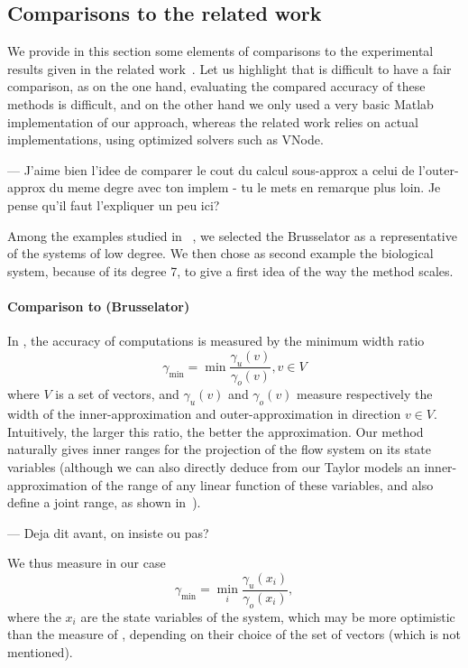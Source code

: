 \documentclass{sig-alternate-05-2015} %
\newcommand\ForAuthors[1]%
 {\par\smallskip                     %
  \begin{center}%
   \fbox%
   {\parbox{0.9\linewidth}%
    {\raggedright\sc--- #1}%
   }%
  \end{center}%
  \par\smallskip                     %
 }
\begin{document}
\subsection{Comparisons to the related work}
\label{sec:exp_compar}
We provide in this section some elements of comparisons to the experimental results given in the related work~\cite{Underapproxflowpipes,underapprox16}.
Let us highlight that is difficult to have a fair comparison, as on the one hand, evaluating the compared accuracy of these methods is difficult, 
and on the other hand we only used a very basic Matlab implementation of our approach, whereas the related work relies on actual implementations,
using optimized solvers such as VNode. 

\ForAuthors{J'aime bien l'idee de comparer le cout du calcul sous-approx
a celui de l'outer-approx du meme degre avec ton implem - tu le mets en
remarque plus loin. Je pense qu'il faut l'expliquer un peu ici?}

Among the examples studied in ~\cite{Underapproxflowpipes,underapprox16}, we selected
the Brusselator as a representative of the systems of low degree. 
We then chose as second example the biological system, because of its degree 7, to give a first idea of the way the method scales. 

\paragraph{Comparison to \cite{Underapproxflowpipes} (Brusselator)}
In  \cite{Underapproxflowpipes}, the  accuracy of computations is measured by the minimum width ratio 
\[ \gamma_{\min}=\min{\frac{\gamma_u(v)}{\gamma_o(v)}}, v \in V \]
where $V$ is a set of vectors, and $\gamma_u(v)$ and $\gamma_o(v)$ measure respectively the width of the inner-approximation and outer-approximation
in direction $v \in V$. 
Intuitively, the larger this ratio, the better the approximation. 
Our method naturally gives inner ranges for the projection of the flow system on its state variables (although we can also directly deduce from our Taylor models 
an inner-approximation of the range of any linear function of these variables, and also define a joint range, as shown in~\cite{hscc14,rc13}).
\ForAuthors{Deja dit avant, on insiste ou pas?} 
We thus measure in our case \[ \gamma_{\min}=\min_{i}{\frac{\gamma_u(x_i)}{\gamma_o(x_i)}}, \]
where the $x_i$ are the state variables of the system, which may be more optimistic than the measure of \cite{Underapproxflowpipes}, depending on their choice 
of the set of vectors (which is not mentioned). 
\end{document}
